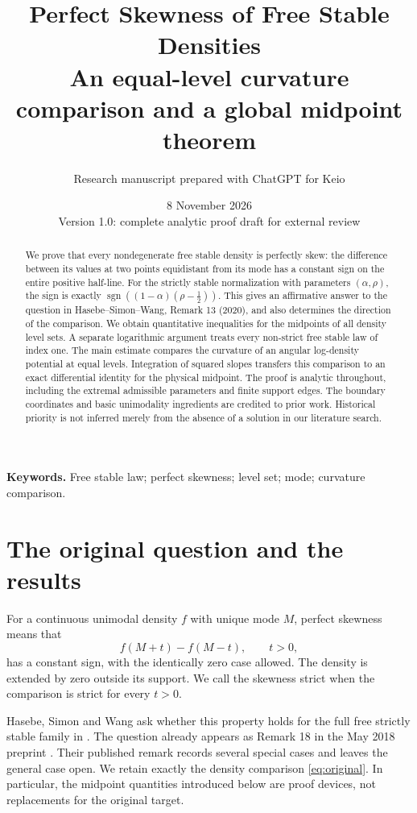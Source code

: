 \documentclass[11pt,a4paper]{article}
\title{\textbf{Perfect Skewness of Free Stable Densities}\\[0.4em]
\large An equal-level curvature comparison and a global midpoint theorem}
\author{Research manuscript prepared with ChatGPT for Keio}
\date{8 November 2026\\[0.3em]
\small Version 1.0: complete analytic proof draft for external review}
\theoremstyle{definition}
\theoremstyle{remark}
\numberwithin{equation}{section}
\newcommand{\sign}{\operatorname{sgn}}
\begin{document}
\maketitle

\begin{abstract}
We prove that every nondegenerate free stable density is perfectly skew:
the difference between its values at two points equidistant from its mode
has a constant sign on the entire positive half-line. For the strictly
stable normalization with parameters $(\alpha,\rho)$, the sign is exactly
$\sign((1-\alpha)(\rho-\tfrac12))$. This gives an affirmative answer to
the question in Hasebe--Simon--Wang, Remark 13 (2020), and also determines
the direction of the comparison. We obtain quantitative inequalities for
the midpoints of all density level sets. A separate logarithmic argument
treats every non-strict free stable law of index one.
The main estimate compares the curvature of an angular log-density
potential at equal levels. Integration of squared slopes transfers this
comparison to an exact differential identity for the physical midpoint.
The proof is analytic throughout, including the extremal admissible
parameters and finite support edges. The boundary coordinates and basic
unimodality ingredients are credited to prior work. Historical priority
is not inferred merely from the absence of a solution in our literature
search.
\end{abstract}

\noindent\textbf{Keywords.}
Free stable law; perfect skewness; level set; mode; curvature comparison.

\section{The original question and the results}
\label{sec:intro}

For a continuous unimodal density $f$ with unique mode $M$, perfect
skewness means that
\begin{equation}\label{eq:original}
 f(M+t)-f(M-t),\qquad t>0,
\end{equation}
has a constant sign, with the identically zero case allowed. The density
is extended by zero outside its support. We call the skewness strict
when the comparison is strict for every $t>0$.

Hasebe, Simon and Wang ask whether this property holds for the full
free strictly stable family in \cite[Remark 13, p.~321]{HSW}. The question
already appears as Remark 18 in the May 2018 preprint \cite{HSWpre}.
Their published remark records several special cases and leaves the
general case open. We retain exactly the density comparison
\eqref{eq:original}. In particular, the midpoint quantities introduced
below are proof devices, not replacements for the original target.
\end{document}
